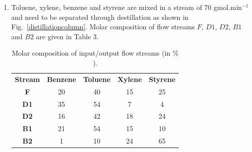 \documentclass[12pts,a4paper,amsmath,amssymb,floatfix]{article}%
\begin{document}
\begin{enumerate}[label=\bfseries Problem \arabic*:]
\begin{enumerate}[label=\bfseries Task \arabic*]
\item\label{Practical1:Task3} Using the van der Waals EOS, calculate the molar volume and compressibility factor ($Z$) of gaseous ammonia at 56.742 bar and 450 K. Repeat your calculations for the following reduced pressures: $P_{r}$ = 1.0, 2.0, 4.0 and 20.0, and plot $P_{r}\times Z$.\hfill{\bf[13 Marks]}

\end{enumerate}

\item Toluene, xylene, benzene and styrene are mixed in a stream of 70 gmol.min$^{-1}$ and need to be separated through destillation as shown in Fig.~\ref{distillationcolumn}. Molar composition of flow streams $F$, $D1$, $D2$, $B1$ and $B2$ are given in Table 3.%

\begin{table}[h]\label{Table3}
\begin{center}
\begin{tabular}{||c | c c c c ||} 
\hline\hline
 {\bf Stream} & {\bf Benzene} & {\bf Toluene} & {\bf Xylene} & {\bf Styrene} \\
    {\bf F}   &   20          &    40         & 15           & 25            \\
\hline
    {\bf D1}  &   35          &    54         & 7            & 4             \\
    {\bf D2}  &   16          &    42         & 18           & 24            \\
\hline
    {\bf B1}  &   21          &    54         & 15           & 10            \\
    {\bf B2}  &   1           &    10         & 24           & 65            \\
\hline\hline
\end{tabular}
\caption{Molar composition of input/output flow streams (in $\%$). }
\end{center}
\end{table}


\end{enumerate}
\end{document}
